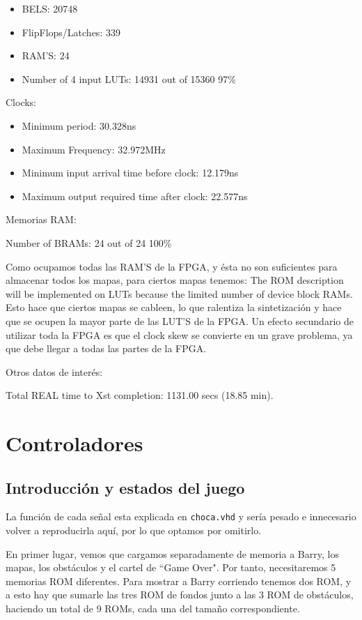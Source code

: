 \documentclass[11pt, a4paper, spanish, openright, twoside]{book}
\begin{document}
	\begin{itemize}
	\item BELS: 20748
	\item FlipFlops/Latches: 339
	\item RAM'S: 24
	\item  Number of 4 input LUTs:  14931  out of  15360    97\%  


\end{itemize}
	Clocks:
	\begin{itemize}
	\item  Minimum period: 30.328ns 
	\item 	Maximum Frequency: 32.972MHz
 	\item  Minimum input arrival time before clock: 12.179ns
   	\item Maximum output required time after clock: 22.577ns

\end{itemize}
	Memorias RAM:
	
	Number of BRAMs:    24  out of     24   100\%  

	Como ocupamos todas las RAM'S de la FPGA, y ésta no son suficientes para almacenar todos los mapas, para ciertos mapas tenemos:
		The ROM description  will be implemented on LUTs because the limited number of device block RAMs.
	Esto hace que ciertos mapas se cableen, lo que ralentiza la sintetización y hace que se ocupen la mayor parte de las LUT'S de la FPGA.
	Un efecto secundario de utilizar toda la FPGA es que el clock skew se convierte en un grave problema, ya que debe llegar a todas 
	 las partes de la FPGA.

	Otros datos de interés:
	
	Total REAL time to Xst completion: 1131.00 secs (18.85 min).

\section{Controladores}
\subsection{Introducción y estados del juego}
La función de cada señal esta explicada en \texttt{choca.vhd} y sería pesado e innecesario volver a reproducirla aquí, por lo que optamos por omitirlo.

En primer lugar, vemos que cargamos separadamente de memoria a Barry,  los mapas, los obstáculos y el cartel de ``Game Over". Por tanto, necesitaremos 5 memorias ROM diferentes. Para mostrar a Barry corriendo tenemos dos ROM, y a esto hay que sumarle las tres ROM de fondos junto a las 3 ROM de obstáculos, haciendo un total de 9 ROMs, cada una del tamaño correspondiente. 
\end{document}
